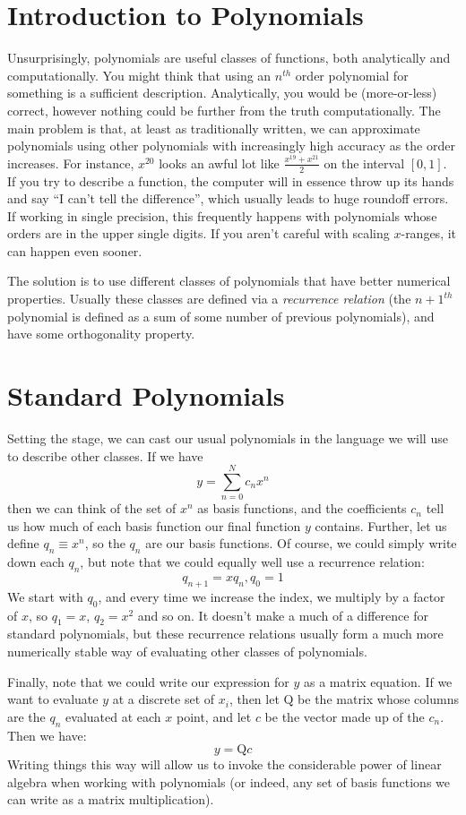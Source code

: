 \documentclass[12]{article}
\begin{document}
\section{Introduction to Polynomials}
Unsurprisingly, polynomials are useful classes of functions, both
analytically and computationally.  You might think that using an
$n^{th}$ order polynomial for something is a sufficient description.
Analytically, you would be (more-or-less) correct, however nothing
could be further from the truth computationally.  The main problem is
that, at least as traditionally written, we can approximate
polynomials using other polynomials with increasingly high accuracy as
the order increases.  For instance, $x^{20}$ looks an awful lot like
$\frac{x^{19}+x^{21}}{2}$ on the interval $[0,1]$.  If you try to describe
a function, the computer will in essence throw up its hands and say
``I can't tell the difference'', which usually leads to huge roundoff
errors.  If working in single precision, this frequently happens with
polynomials whose orders are in the upper single digits. If you aren't
careful with scaling $x$-ranges, it can happen even sooner.  

The solution is to use different classes of polynomials that have
better numerical properties.  Usually these classes are defined via a
\textit{recurrence relation} (the $n+1^{th}$ polynomial is defined as a
sum of some number of previous polynomials), and have some
orthogonality property. 

\section{Standard Polynomials}
Setting the stage, we can cast our usual polynomials in the language
we will use to describe other classes.  If we have
$$y=\sum_{n=0}^{N} c_n x^n$$
then we can think of the set of $x^n$ as basis functions, and the
coefficients $c_n$ tell us how much of each basis function our final
function $y$ contains.  Further, let us define $q_n \equiv x^n$, so
the $q_n$ are our basis functions.  Of course, we could simply write
down each $q_n$, but note that we could equally well use a recurrence
relation:
$$q_{n+1}=xq_n, q_0=1$$
We start with $q_0$, and every time we increase the index, we multiply
by a factor of $x$, so $q_1=x$, $q_2=x^2$ and so on.  
It doesn't make a much of a difference for standard polynomials, but
these recurrence relations usually form a much more numerically stable
way of evaluating other classes of polynomials.  

Finally, note that we could write our expression for $y$ as a matrix
equation.  If we want to evaluate $y$ at a discrete set of $x_i$, then
let $\mathrm{Q}$ be the matrix whose columns are the $q_n$ evaluated
at each $x$ point, and let $c$ be the vector made up of the $c_n$.
Then we have:
$$y=\mathrm{Q}c$$
Writing things this way will allow us to invoke the considerable power
of linear algebra when working with polynomials (or indeed, any set of
basis functions we can write as a matrix multiplication). 
\end{document}
